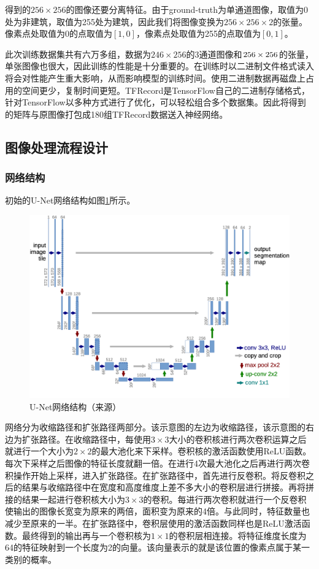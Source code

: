 得到的$256\times 256$的图像还要分离特征。由于ground-truth为单通道图像，取值为0处为非建筑，取值为255处为建筑，因此我们将图像变换为$256\times 256\times 2$的张量。像素点处取值为0的点取值为$[1,0]$，像素点处取值为255的点取值为$[0,1]$。

此次训练数据集共有六万多组，数据为$246\times 256$的3通道图像和$256\times 256\time 2$的张量，单张图像也很大，因此训练的性能是十分重要的。在训练时以二进制文件格式读入将会对性能产生重大影响，从而影响模型的训练时间。使用二进制数据再磁盘上占用的空间更少，复制时间更短。TFRecord是TensorFlow自己的二进制存储格式，针对TensorFlow以多种方式进行了优化，可以轻松组合多个数据集。因此将得到的矩阵与原图像打包成180组TFRecord数据送入神经网络。
\subsection{图像处理流程设计}
\subsubsection{网络结构}
初始的U-Net网络结构如图\ref{Fig:unet_construction}所示。

\begin{figure}[htbp]
    \centering
    \includegraphics[width=1\textwidth]{Figures/unet_construction.png}
    \caption{U-Net网络结构（来源\cite{ronneberger2015u}）}
    \label{Fig:unet_construction}
    
\end{figure}

网络分为收缩路径和扩张路径两部分。该示意图的左边为收缩路径，该示意图的右边为扩张路径。在收缩路径中，每使用$3\times 3$大小的卷积核进行两次卷积运算之后就进行一个大小为$2\times 2$的最大池化来下采样。卷积核的激活函数使用ReLU函数。每次下采样之后图像的特征长度就翻一倍。在进行4次最大池化之后再进行两次卷积操作开始上采样，进入扩张路径。在扩张路径中，首先进行反卷积。将反卷积之后的结果与收缩路径中在宽度和高度维度上差不多大小的卷积层进行拼接。再将拼接的结果一起进行卷积核大小为$3\times 3$的卷积。每进行两次卷积就进行一个反卷积使输出的图像长宽变为原来的两倍，面积变为原来的4倍。与此同时，特征数量也减少至原来的一半。在扩张路径中，卷积层使用的激活函数同样也是ReLU激活函数。最终得到的输出再与一个卷积核为$1\times 1$的卷积层相连接。将特征维度长度为64的特征映射到一个长度为2的向量。该向量表示的就是该位置的像素点属于某一类别的概率。

